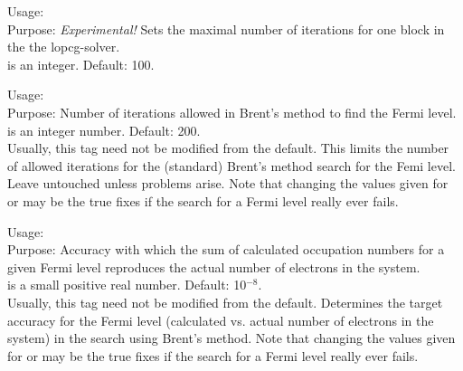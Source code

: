 { 
  \noindent
  Usage:   \\[1.0ex]
  Purpose: \emph{Experimental!} Sets the maximal number of iterations for
    one block in the the lopcg-solver.\\[1.0ex]
   is an integer. Default: 100. \\
} 

{
  \noindent
  Usage:   \\[1.0ex]
  Purpose: Number of iterations allowed in Brent's method to find the
    Fermi level. \\[1.0ex]
   is an integer number. Default: 200. \\
}
Usually, this tag need not be modified from the default. This limits
the number of allowed iterations for the (standard) Brent's method
search for the Femi level. Leave untouched unless problems arise.
Note that changing the values given for  or
 may be the true fixes if the search for a
Fermi level really ever fails. 

{
  \noindent
  Usage:   \\[1.0ex]
  Purpose: Accuracy with which the sum of calculated occupation numbers for a 
    given Fermi level reproduces the actual number of electrons in the
    system. \\[1.0ex]
   is a small positive real number. Default:
    10$^{-8}$. \\
}
Usually, this tag need not be modified from the default. Determines
the target accuracy for the Fermi level (calculated vs. actual number 
of electrons in the system) in the search using Brent's method. Note
  that changing the values given for  or 
 may be the true fixes if the search for a
Fermi level really ever fails. 

